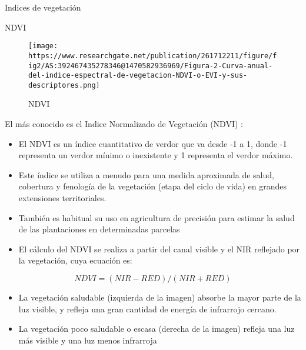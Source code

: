 \documentclass[
  ignorenonframetext,
]{beamer}
\begin{document}
\begin{frame}{Indices de vegetación}
\protect\hypertarget{indices-de-vegetaciuxf3n}{}
\begin{block}{NDVI}
\protect\hypertarget{ndvi}{}
\begin{figure}
\centering
\texttt{[image: https://www.researchgate.net/publication/261712211/figure/fig2/AS:392467435278346@1470582936969/Figura-2-Curva-anual-del-indice-espectral-de-vegetacion-NDVI-o-EVI-y-sus-descriptores.png]}
\caption{NDVI}
\end{figure}

El más conocido es el Indice Normalizado de Vegetación (NDVI) :

\begin{itemize}
\item
  El NDVI es un índice cuantitativo de verdor que va desde -1 a 1, donde
  -1 representa un verdor mínimo o inexistente y 1 representa el verdor
  máximo.
\item
  Este índice se utiliza a menudo para una medida aproximada de salud,
  cobertura y fenología de la vegetación (etapa del ciclo de vida) en
  grandes extensiones territoriales.
\item
  También es habitual su uso en agricultura de precisión para estimar la
  salud de las plantaciones en determinadas parcelas
\item
  El cálculo del NDVI se realiza a partir del canal visible y el NIR
  reflejado por la vegetación, cuya ecuación es:
\end{itemize}

\[ NDVI= (NIR- RED) /(NIR +RED)\]

\begin{itemize}
\item
  La vegetación saludable (izquierda de la imagen) absorbe la mayor
  parte de la luz visible, y refleja una gran cantidad de energía de
  infrarrojo cercano.
\item
  La vegetación poco saludable o escasa (derecha de la imagen) refleja
  una luz más visible y una luz menos infrarroja
\end{itemize}
\end{block}
\end{frame}
\end{document}
